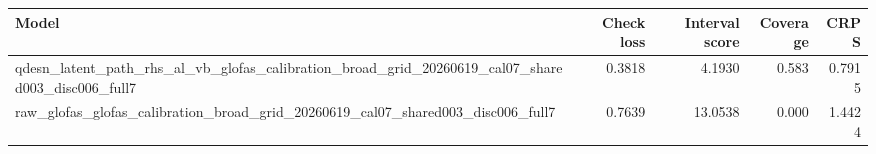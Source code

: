 \begin{tabular}{lrrrr}
\toprule
Model & Check loss & Interval score & Coverage & CRPS \\
\midrule
qdesn_latent_path_rhs_al_vb_glofas_calibration_broad_grid_20260619_cal07_shared003_disc006_full7 & 0.3818 & 4.1930 & 0.583 & 0.7915 \\
raw_glofas_glofas_calibration_broad_grid_20260619_cal07_shared003_disc006_full7 & 0.7639 & 13.0538 & 0.000 & 1.4424 \\
\bottomrule
\end{tabular}
